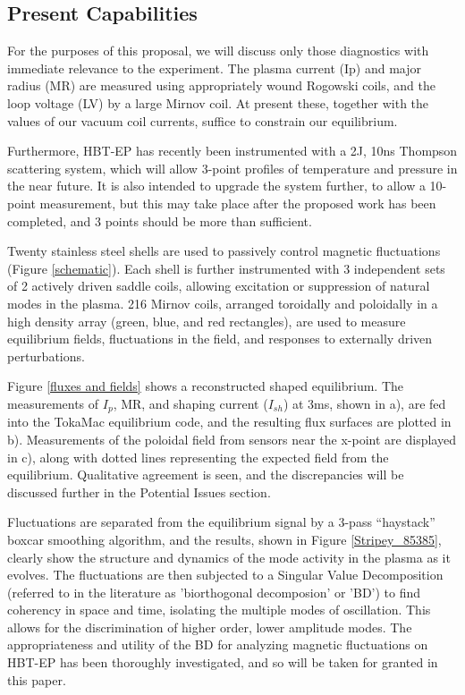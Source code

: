 \documentclass[aps,prl,twocolumn,superscriptaddress,groupedaddress]{revtex4}  %
\begin{document}
\subsection{Present Capabilities}
	For the purposes of this proposal, we will discuss only those diagnostics with immediate relevance to the experiment.  The plasma current (Ip) and major radius (MR) are measured using appropriately wound Rogowski coils, and the loop voltage (LV) by a large Mirnov coil.  At present these, together with the values of our vacuum coil currents, suffice to constrain our equilibrium.\par
	Furthermore, HBT-EP has recently been instrumented with a 2J, 10ns Thompson scattering system, which will allow 3-point profiles of temperature and pressure in the near future.  It is also intended to upgrade the system further, to allow a 10-point measurement, but this may take place after the proposed work has been completed, and 3 points should be more than sufficient.\par
	Twenty stainless steel shells are used to passively control magnetic fluctuations (Figure \ref{schematic}).  Each shell is further instrumented with 3 independent sets of 2 actively driven saddle coils, allowing excitation or suppression of natural modes in the plasma.  216 Mirnov coils, arranged toroidally and poloidally in a high density array (green, blue, and red rectangles), are used to measure equilibrium fields, fluctuations in the field, and responses to externally driven perturbations.\par
	Figure \ref{fluxes and fields} shows a reconstructed shaped equilibrium.  The measurements of $I_p$, MR, and shaping current ($I_{sh}$) at 3ms, shown in a), are fed into the TokaMac equilibrium code, and the resulting flux surfaces are plotted in b).  Measurements of the poloidal field from sensors near the x-point are displayed in c), along with dotted lines representing the expected field from the equilibrium.  Qualitative agreement is seen, and the discrepancies will be discussed further in the Potential Issues section.\par
	Fluctuations are separated from the equilibrium signal by a 3-pass ``haystack'' boxcar smoothing algorithm, and the results, shown in Figure \ref{Stripey_85385}, clearly show the structure and dynamics of the mode activity in the plasma as it evolves.  The fluctuations are then subjected to a Singular Value Decomposition (referred to in the literature as 'biorthogonal decomposion' or 'BD'\cite{de Wit}) to find coherency in space and time, isolating the multiple modes of oscillation.  This allows for the discrimination of higher order, lower amplitude modes.  The appropriateness and utility of the BD for analyzing magnetic fluctuations on HBT-EP has been thoroughly investigated\cite{Levesque}, and so will be taken for granted in this paper.\par
\end{document}
